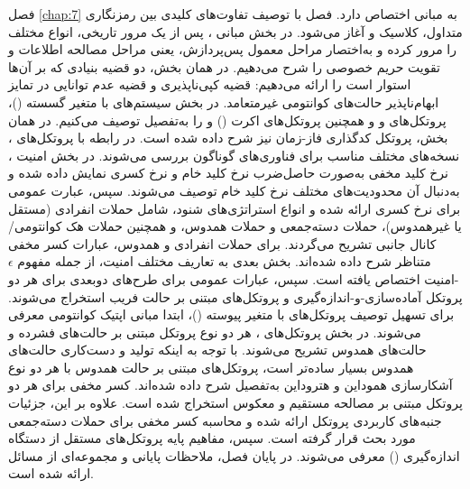 فصل \ref{chap:7} به مبانی  اختصاص دارد. فصل با توصیف تفاوت‌های کلیدی بین رمزنگاری متداول،  کلاسیک و  آغاز می‌شود. در بخش مبانی ، پس از یک مرور تاریخی، انواع مختلف  را مرور کرده و به‌اختصار مراحل معمول پس‌پردازش، یعنی مراحل مصالحه اطلاعات و تقویت حریم خصوصی را شرح می‌دهیم. در همان بخش، دو قضیه بنیادی که  بر آن‌ها استوار است را ارائه می‌دهیم: قضیه کپی‌ناپذیری و قضیه عدم توانایی در تمایز ابهام‌ناپذیر حالت‌های کوانتومی غیرمتعامد. در بخش سیستم‌های  با متغیر گسسته ()، پروتکل‌های  و  و همچنین پروتکل‌های اکرت () و  را به‌تفصیل توصیف می‌کنیم. در همان بخش، پروتکل کدگذاری فاز-زمان نیز شرح داده شده است. در رابطه با پروتکل‌های ، نسخه‌های مختلف مناسب برای فناوری‌های گوناگون بررسی می‌شوند. در بخش امنیت ، نرخ کلید مخفی به‌صورت حاصل‌ضرب نرخ کلید خام و نرخ کسری نمایش داده شده و به‌دنبال آن محدودیت‌های مختلف نرخ کلید خام توصیف می‌شوند. سپس، عبارت عمومی برای نرخ کسری ارائه شده و انواع استراتژی‌های شنود، شامل حملات انفرادی (مستقل یا غیرهمدوس)، حملات دسته‌جمعی و حملات همدوس، و همچنین حملات هک کوانتومی/کانال جانبی تشریح می‌گردند. برای حملات انفرادی و همدوس، عبارات کسر مخفی متناظر شرح داده شده‌اند. بخش بعدی به تعاریف مختلف امنیت، از جمله مفهوم $\epsilon$-امنیت اختصاص یافته است. سپس، عبارات عمومی برای طرح‌های  دوبعدی برای هر دو پروتکل آماده‌سازی-و-اندازه‌گیری و پروتکل‌های مبتنی بر حالت فریب استخراج می‌شوند. برای تسهیل توصیف پروتکل‌های  با متغیر پیوسته ()، ابتدا مبانی اپتیک کوانتومی معرفی می‌شوند. در بخش پروتکل‌های ، هر دو نوع پروتکل مبتنی بر حالت‌های فشرده و حالت‌های همدوس تشریح می‌شوند. با توجه به اینکه تولید و دست‌کاری حالت‌های همدوس بسیار ساده‌تر است، پروتکل‌های مبتنی بر حالت همدوس با هر دو نوع آشکارسازی هموداین و هتروداین به‌تفصیل شرح داده شده‌اند. کسر مخفی برای هر دو پروتکل  مبتنی بر مصالحه مستقیم و معکوس استخراج شده است. علاوه‌ بر این، جزئیات جنبه‌های کاربردی پروتکل  ارائه شده و محاسبه کسر مخفی برای حملات دسته‌جمعی مورد بحث قرار گرفته است. سپس، مفاهیم پایه پروتکل‌های  مستقل از دستگاه اندازه‌گیری () معرفی می‌شوند. در پایان فصل، ملاحظات پایانی و مجموعه‌ای از مسائل ارائه شده است.

